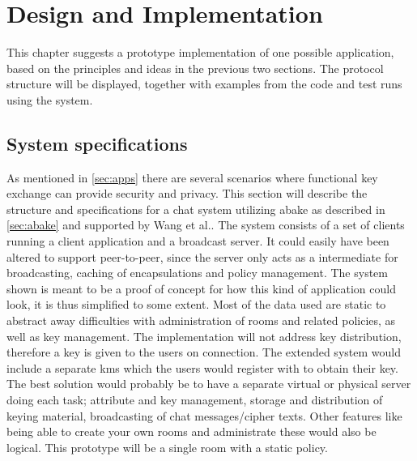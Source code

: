 \chapter{Design and Implementation}\label{chp:designimpl}
This chapter suggests a prototype implementation of one possible application, based on the principles and ideas in the previous two sections. The protocol structure will be displayed, together with examples from the code and test runs using the system.

\section{System specifications}\label{sec:chat}
As mentioned in \ref{sec:apps} there are several scenarios where functional key exchange can provide security and privacy. This section will describe the structure and specifications for a chat system utilizing \gls{abake} as described in \ref{sec:abake} and  supported by Wang et al.\cite{DBLP:abake}. The system consists of a set of clients running a client application and a broadcast server. It could easily have been altered to support peer-to-peer, since the server only acts as a intermediate for broadcasting, caching of encapsulations and policy management. The system shown is meant to be a proof of concept for how this kind of application could look, it is thus simplified to some extent. Most of the data used are static to abstract away difficulties with administration of rooms and related policies, as well as key management. The implementation will not address key distribution, therefore a key is given to the users on connection. The extended system would include a separate \gls{kms} which the users would register with to obtain their key. The best solution would probably be to have a separate virtual or physical server doing each task; attribute and key management, storage and distribution of keying material, broadcasting of chat messages/cipher texts. Other features like being able to create your own rooms and administrate these would also be logical. This prototype will be a single room with a static policy.
